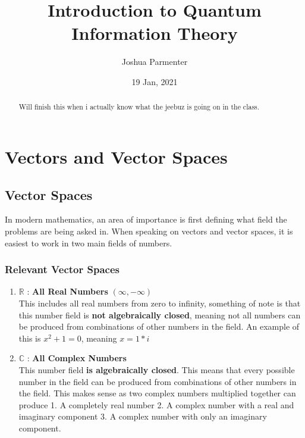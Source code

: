 \documentclass[12pt]{article}
\title{Introduction to Quantum Information Theory}
\author{Joshua Parmenter}
\date{19 Jan, 2021}
\theoremstyle{plain}
\theoremstyle{nonumberplain}
\theoremstyle{plain}
\theoremstyle{nonumberplain}
\newcommand\1{{\bf 1}}
\newcommand{\R}{\mathbb{R}} %
\newcommand{\C}{\mathbb{C}} %
\newcommand{\<}{\left\langle}
\renewcommand{\>}{\right\rangle}
\begin{document}
\maketitle

\begin{abstract}
Will finish this when i actually know what the jeebuz is going on in the class. 
\end{abstract}

\tableofcontents
\pagebreak

\section{Vectors and Vector Spaces}

\subsection{Vector Spaces}
In modern mathematics, an area of importance is first defining what field the problems are being asked in.  When speaking on vectors and vector spaces, it is easiest to work in two main fields of numbers.

\subsubsection{Relevant Vector Spaces}
\begin{enumerate}
	\item $\R$ : \textbf{All Real Numbers} $(\infty, -\infty)$ \\
	
	This includes all real numbers from zero to infinity, something of note is that this number field is \textbf{not algebraically closed}, meaning not all numbers can be produced from combinations of other numbers in the field.  An example of this is $x^2 + 1 = 0$, meaning $x = 1*i$
	
	\item $\C$ : \textbf{All Complex Numbers} \\
	
	This number field \textbf{is algebraically closed}.  This means that every possible number in the field can be produced from combinations of other numbers in the field.  This makes sense as two complex numbers multiplied together can produce 1. A completely real number 2. A complex number with a real and imaginary component 3. A complex number with only an imaginary component.
\end{enumerate}
\end{document}
